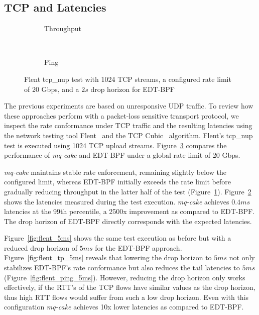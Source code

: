 \subsection{TCP and Latencies}
\begin{figure}[t]
    \centering
    \hspace{-0.25cm}
    \begin{subfigure}{\linewidth}
        \centering
        
        \caption{Throughput}\label{fig:flent_tp_2s}
    \end{subfigure}
    \\
    \begin{subfigure}{\linewidth}
        \centering
        
        \caption{Ping}\label{fig:flent_ping_2s}
    \end{subfigure}
    \caption{Flent tcp\_nup test with 1024 TCP streams, a configured rate limit of 20 Gbps, and a $2s$ drop horizon for EDT-BPF}\label{fig:flent_2s}
\end{figure}

The previous experiments are based on unresponsive UDP traffic.
To review how these approaches perform with a packet-loss sensitive transport protocol, we inspect the rate conformance under TCP traffic and the resulting latencies using the network testing tool Flent~\cite{flent} and the TCP Cubic~\cite{tcp-cubic} algorithm.
%
Flent's tcp\_nup test is executed using 1024 TCP upload streams.
%
Figure~\ref{fig:flent_2s} compares the performance of \textit{mq-cake} and EDT-BPF under a global rate limit of 20 Gbps.

\textit{mq-cake} maintains stable rate enforcement, remaining slightly below the configured limit, whereas EDT-BPF initially exceeds the rate limit before gradually reducing throughput in the latter half of the test (Figure~\ref{fig:flent_tp_2s}).
%
Figure~\ref{fig:flent_ping_2s} shows the latencies measured during the test execution. \textit{mq-cake} achieves $0.4 ms$ latencies at the 99th percentile, a 2500x improvement as compared to EDT-BPF.
%
The drop horizon of EDT-BPF directly corresponds with the expected latencies.
%

Figure~\ref{fig:flent_5ms} shows the same test execution as before but with a reduced drop horizon of $5ms$ for the EDT-BPF approach. Figure~\ref{fig:flent_tp_5ms} reveals that lowering the drop horizon to $5ms$ not only stabilizes EDT-BPF's rate conformance but also reduces the tail latencies to $5ms$ (Figure~\ref{fig:flent_ping_5ms}).
%
However, reducing the drop horizon only works effectively, if the RTT's of the TCP flows have similar values as the drop horizon, thus high RTT flows would suffer from such a low drop horizon.
Even with this configuration \textit{mq-cake} achieves 10x lower latencies as compared to EDT-BPF. 

